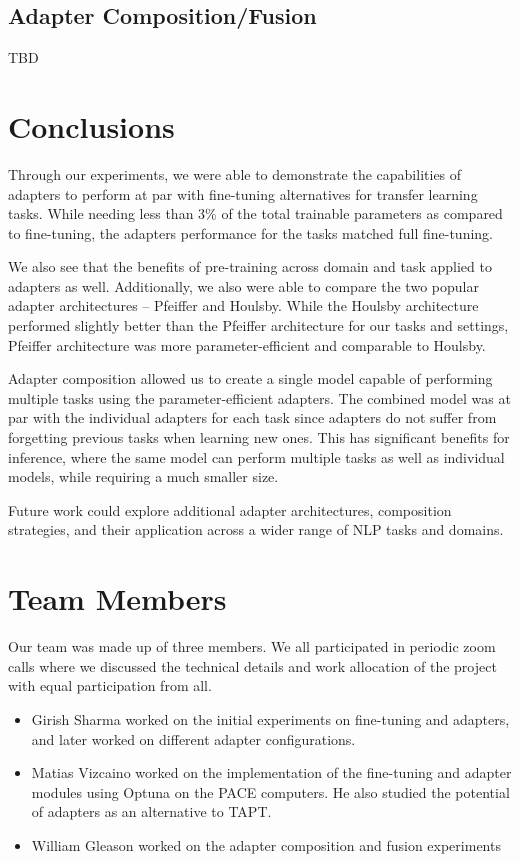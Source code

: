 \documentclass[draft,10pt,twocolumn,letterpaper]{article}
\begin{document}
\subsection{Adapter Composition/Fusion}
TBD




\section{Conclusions}
Through our experiments, we were able to demonstrate the capabilities of adapters to perform at par with fine-tuning alternatives for transfer learning tasks. While needing less than 3\% of the total trainable parameters as compared to fine-tuning, the adapters performance for the tasks matched full fine-tuning.

We also see that the benefits of pre-training across domain and task applied to adapters as well.
Additionally, we also were able to compare the two popular adapter architectures – Pfeiffer and Houlsby. While the Houlsby architecture performed slightly better than the Pfeiffer architecture for our tasks and settings, Pfeiffer architecture was more parameter-efficient and comparable to Houlsby. 

Adapter composition allowed us to create a single model capable of performing multiple tasks using the parameter-efficient adapters. The combined model was at par with the individual adapters for each task since adapters do not suffer from forgetting previous tasks when learning new ones. This has significant benefits for inference, where the same model can perform multiple tasks as well as individual models, while requiring a much smaller size.

Future work could explore additional adapter architectures, composition strategies, and their application across a wider range of NLP tasks and domains.


\onecolumn

\section{Team Members}




Our team was made up of three members. We all participated in periodic zoom calls where we discussed the technical details and work allocation of the project with equal participation from all.

\begin{itemize}
    \item Girish Sharma worked on the initial experiments on fine-tuning and adapters, and later worked on different adapter configurations.
    \item Matias Vizcaino worked on the implementation of the fine-tuning and adapter modules using Optuna on the PACE computers. He also studied the potential of adapters as an alternative to TAPT.
    \item William Gleason worked on the adapter composition and fusion experiments
\end{itemize}
\end{document}
